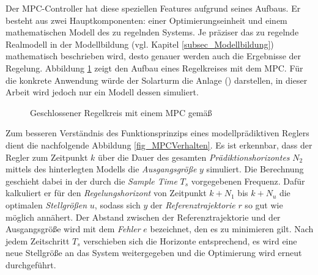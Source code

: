 Der MPC-Controller hat diese speziellen Features aufgrund seines Aufbaus.
Er besteht aus zwei Hauptkomponenten: einer Optimierungseinheit und einem mathematischen Modell des zu regelnden Systems.
Je präziser das zu regelnde Realmodell in der Modellbildung (vgl. Kapitel \ref{subsec_Modellbildung}) mathematisch beschrieben wird, desto genauer werden auch die Ergebnisse der Regelung.
Abbildung \ref{fig_RegelkreisMPC} zeigt den Aufbau eines Regelkreises mit dem MPC.
Für die konkrete Anwendung würde der Solarturm die Anlage () darstellen, in dieser Arbeit wird jedoch nur ein Modell dessen simuliert.

\begin{figure}[h!]
    \centering
    \setlength{\fboxsep}{1pt}
    \setlength{\fboxrule}{1pt}
\caption[Geschlossener Regelkreis mit einem MPC]{Geschlossener Regelkreis mit einem MPC gemäß\cite[S.2]{Schwenzer}}
    \label{fig_RegelkreisMPC}
\end{figure}

Zum besseren Verständnis des Funktionsprinzips eines modellprädiktiven Reglers dient die nachfolgende Abbildung \ref{fig_MPCVerhalten}.
Es ist erkennbar, dass der Regler zum Zeitpunkt $k$ über die Dauer des gesamten \textit{Prädiktionshorizontes} $N_2$ mittels des hinterlegten Modells die \textit{Ausgangsgröße} $y$ simuliert.
Die Berechnung geschieht dabei in der durch die \textit{Sample Time} $T_s$ vorgegebenen Frequenz.
Dafür kalkuliert er für den \textit{Regelungshorizont} von Zeitpunkt $k+N_1$ bis $k+N_u$ die optimalen \textit{Stellgrößen} $u$, sodass sich $y$ der \textit{Referenztrajektorie} $r$ so gut wie möglich annähert.
Der Abstand zwischen der Referenztrajektorie und der Ausgangsgröße wird mit dem \textit{Fehler} $e$ bezeichnet, den es zu minimieren gilt.
Nach jedem Zeitschritt $T_s$ verschieben sich die Horizonte entsprechend, es wird eine neue Stellgröße an das System weitergegeben und die Optimierung wird erneut durchgeführt. \cite[S.3]{Schwenzer}

